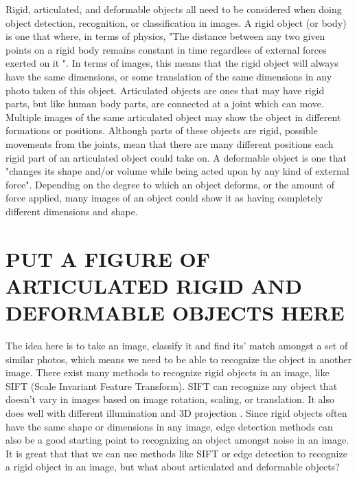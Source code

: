 \documentclass[12pt]{article} %
\begin{document}
	Rigid, articulated, and deformable objects all need to be considered when doing object detection, recognition, or classification in images. A rigid object (or body) is one that where, in terms of physics, "The distance between any two given points on a rigid body remains constant in time regardless of external forces exerted on it "\cite{RigidBodyWiki}. In terms of images, this means that the rigid object will always have the same dimensions, or some translation of the same dimensions in any photo taken of this object. Articulated objects are ones that may have rigid parts, but like human body parts, are connected at a joint which can move\cite{szeliski2010computer}. Multiple images of the same articulated object may show the object in different formations or positions. Although parts of these objects are rigid, possible movements from the joints, mean that there are many different positions each rigid part of an articulated object could take on. A deformable object is one that "changes its shape and/or volume while being acted upon by any kind of external force"\cite{wolfram}. Depending on the degree to which an object deforms, or the amount of force applied, many images of an object could show it as having completely different dimensions and shape. 
	
\section{PUT A FIGURE OF ARTICULATED RIGID AND DEFORMABLE OBJECTS HERE}
	
	
	The idea here is to take an image, classify it and find its' match amongst a set of similar photos, which means we need to be able to recognize the object in another image. There 	exist many methods to recognize rigid objects in an image, like SIFT (Scale Invariant Feature Transform). SIFT can recognize any object that doesn't vary in images based on image rotation, scaling, or translation. It also does well with different illumination and 3D projection \cite{lowe1999object}. Since rigid objects often have the same shape or dimensions in any image, edge detection methods can also be a good starting point to recognizing an object amongst noise in an image. It is great that that we can use methods like SIFT or edge detection to recognize a rigid object in an image, but what about articulated and deformable objects? 
\end{document}
